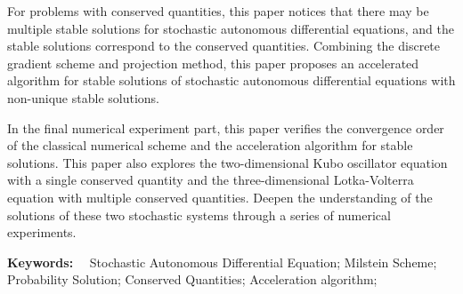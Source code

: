 \begin{normalsize}
For problems with conserved quantities, this paper notices that there may be multiple stable solutions for stochastic autonomous differential equations, and the stable solutions correspond to the conserved quantities. Combining the discrete gradient scheme and projection method, this paper proposes an accelerated algorithm for stable solutions of stochastic autonomous differential equations with non-unique stable solutions. 

In the final numerical experiment part, this paper verifies the convergence order of the classical numerical scheme and the acceleration algorithm for stable solutions. This paper also explores the two-dimensional Kubo oscillator equation with a single conserved quantity and the three-dimensional Lotka-Volterra equation with multiple conserved quantities. Deepen the understanding of the solutions of these two stochastic systems through a series of numerical experiments.

\vspace{1em}

\textbf{Keywords:}~~
Stochastic Autonomous Differential Equation; 
Milstein Scheme; 
Probability Solution; 
Conserved Quantities; 
Acceleration algorithm; 

\end{normalsize}